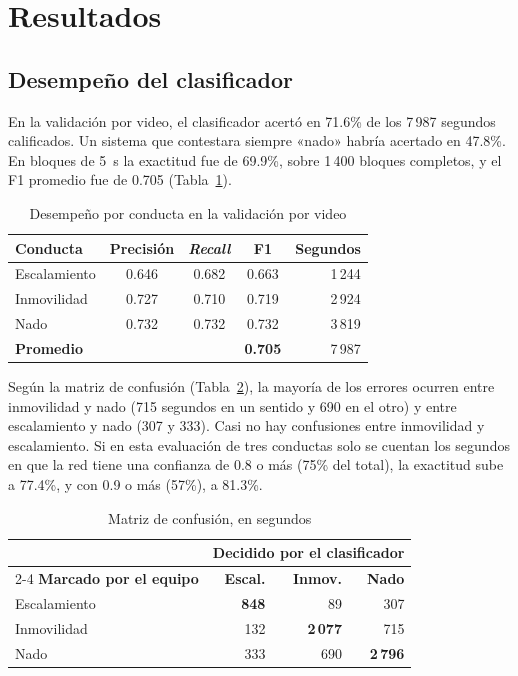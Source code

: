 \documentclass[conference,letterpaper]{IEEEtran}
\begin{document}
\section{Resultados}

\subsection{Desempeño del clasificador}

En la validación por video, el clasificador acertó en 71.6\% de los 7\,987 segundos
calificados. Un sistema que contestara siempre «nado» habría acertado en 47.8\%. En bloques
de 5~s la exactitud fue de 69.9\%, sobre 1\,400 bloques completos, y el F1 promedio fue de
0.705 (Tabla~\ref{tab:metricas}).

\begin{table}[t]
\renewcommand{\arraystretch}{1.15}
\caption{Desempeño por conducta en la validación por video}
\label{tab:metricas}
\centering
\footnotesize
\begin{tabular}{|l|c|c|c|r|}
\hline
\textbf{Conducta} & \textbf{Precisión} & \textbf{\textit{Recall}} & \textbf{F1} & \textbf{Segundos} \\
\hline
Escalamiento & 0.646 & 0.682 & 0.663 & 1\,244 \\
\hline
Inmovilidad & 0.727 & 0.710 & 0.719 & 2\,924 \\
\hline
Nado & 0.732 & 0.732 & 0.732 & 3\,819 \\
\hline
\textbf{Promedio} & & & \textbf{0.705} & 7\,987 \\
\hline
\end{tabular}
\end{table}

Según la matriz de confusión (Tabla~\ref{tab:confusion}), la mayoría de los errores ocurren
entre inmovilidad y nado (715 segundos en un sentido y 690 en el otro) y entre escalamiento
y nado (307 y 333). Casi no hay confusiones entre inmovilidad y escalamiento. Si en esta evaluación de tres
conductas solo se cuentan los segundos en que la red tiene una confianza de 0.8 o más
(75\% del total), la exactitud sube a 77.4\%, y con 0.9 o más (57\%), a 81.3\%.

\begin{table}[t]
\renewcommand{\arraystretch}{1.15}
\caption{Matriz de confusión, en segundos}
\label{tab:confusion}
\centering
\footnotesize
\begin{tabular}{|l|r|r|r|}
\hline
 & \multicolumn{3}{c|}{\textbf{Decidido por el clasificador}} \\
\cline{2-4}
\textbf{Marcado por el equipo} & \textbf{Escal.} & \textbf{Inmov.} & \textbf{Nado} \\
\hline
Escalamiento & \textbf{848} & 89 & 307 \\
\hline
Inmovilidad & 132 & \textbf{2\,077} & 715 \\
\hline
Nado & 333 & 690 & \textbf{2\,796} \\
\hline
\end{tabular}
\end{table}
\end{document}
